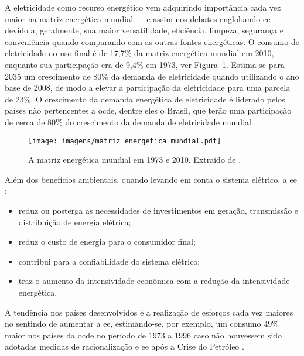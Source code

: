 
A eletricidade como recurso energético vem adquirindo importância cada
vez maior na matriz energética mundial --- e assim nos debates
englobando \gls{ee} --- devido a, geralmente, sua maior versatilidade,
eficiência, limpeza, segurança e conveniência quando comparando com as
outras fontes energéticas. O consumo de eletricidade no uso final é de
17,7\% da matriz energética mundial em 2010, enquanto sua participação
era de 9,4\% em 1973, ver Figura~\ref{fig:matriz_mundial}. Estima-se
para 2035 um crescimento de 80\% da demanda de eletricidade quando
utilizando o ano base de 2008, de modo a elevar a participação da
eletricidade para uma parcela de 23\%. O crescimento da demanda
energética de eletricidade é liderado pelos países não pertencentes a
\gls{ocde}, dentre eles o Brasil, que terão uma participação de cerca
de 80\% do crescimento da demanda de eletricidade mundial
\cite{iea_weo2010}.


\begin{figure}[h!t]
\centering
\texttt{[image: imagens/matriz\_energetica\_mundial.pdf]}
\caption[A matriz energética mundial em 1973 e 2010.]
{A matriz energética mundial em 1973 e 2010. Extraído de
\cite[pp. 28, tradução própria]{world_statics_2012}.}
\label{fig:matriz_mundial}
\end{figure}

Além dos benefícios ambientais, quando levando em conta o sistema
elétrico, a \gls{ee} \cite{jannuzzi,epe_slides_eficiencia}:

\begin{itemize}
\item reduz ou posterga as necessidades de investimentos em geração,
transmissão e distribuição de energia elétrica;
\item reduz o custo de energia para o consumidor final;
\item contribui para a confiabilidade do sistema elétrico;
\item traz o aumento da intensividade econômica com a redução da
intensividade energética.
\end{itemize}

A tendência nos países desenvolvidos é a realização de esforços
cada vez maiores no sentindo de aumentar a \gls{ee},
estimando-se, por exemplo, um consumo 49\% maior nos países da \gls{ocde}
no período de 1973 a 1996 caso não houvessem sido adotadas medidas de
racionalização e \gls{ee} após a Crise do Petróleo
\cite{goldemberg,epe_slides_eficiencia}.

